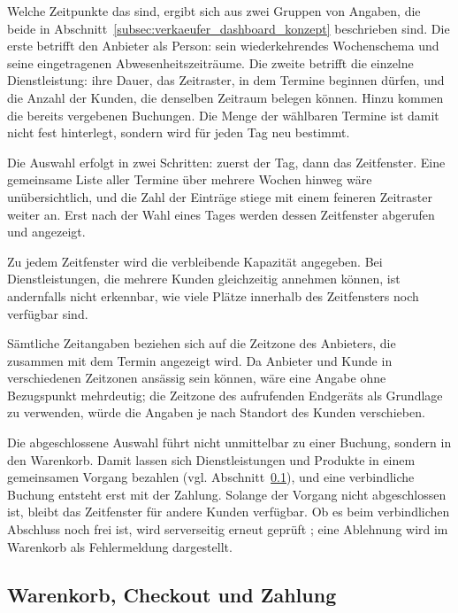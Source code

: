 Welche Zeitpunkte das sind, ergibt sich aus zwei Gruppen von Angaben,
die beide in Abschnitt~\ref{subsec:verkaeufer_dashboard_konzept}
beschrieben sind. Die erste betrifft den Anbieter als Person: sein
wiederkehrendes Wochenschema und seine eingetragenen
Abwesenheitszeiträume. Die zweite betrifft die einzelne
Dienstleistung: ihre Dauer, das Zeitraster, in dem Termine beginnen
dürfen, und die Anzahl der Kunden, die denselben Zeitraum belegen
können. Hinzu kommen die bereits vergebenen Buchungen. Die Menge der
wählbaren Termine ist damit nicht fest hinterlegt, sondern wird für
jeden Tag neu bestimmt.

Die Auswahl erfolgt in zwei Schritten: zuerst der Tag, dann das
Zeitfenster. Eine gemeinsame Liste aller Termine über mehrere Wochen
hinweg wäre unübersichtlich, und die Zahl der Einträge stiege mit
einem feineren Zeitraster weiter an. Erst nach der Wahl eines Tages
werden dessen Zeitfenster abgerufen und angezeigt.

Zu jedem Zeitfenster wird die verbleibende Kapazität angegeben. Bei
Dienstleistungen, die mehrere Kunden gleichzeitig annehmen können,
ist andernfalls nicht erkennbar, wie viele Plätze innerhalb des
Zeitfensters noch verfügbar sind.

Sämtliche Zeitangaben beziehen sich auf die Zeitzone des Anbieters,
die zusammen mit dem Termin angezeigt wird. Da Anbieter und Kunde in
verschiedenen Zeitzonen ansässig sein können, wäre eine Angabe ohne
Bezugspunkt mehrdeutig; die Zeitzone des aufrufenden Endgeräts als
Grundlage zu verwenden, würde die Angaben je nach Standort des Kunden
verschieben.

Die abgeschlossene Auswahl führt nicht unmittelbar zu einer Buchung,
sondern in den Warenkorb. Damit lassen sich Dienstleistungen und
Produkte in einem gemeinsamen Vorgang bezahlen (vgl.
Abschnitt~\ref{subsec:warenkorb_konzept}), und eine verbindliche
Buchung entsteht erst mit der Zahlung. Solange der Vorgang nicht
abgeschlossen ist, bleibt das Zeitfenster für andere Kunden
verfügbar. Ob es beim verbindlichen Abschluss noch frei ist, wird
serverseitig erneut geprüft \cite{alaatki_backend}; eine Ablehnung
wird im Warenkorb als Fehlermeldung dargestellt.


\subsection{Warenkorb, Checkout und Zahlung}
\label{subsec:warenkorb_konzept}

